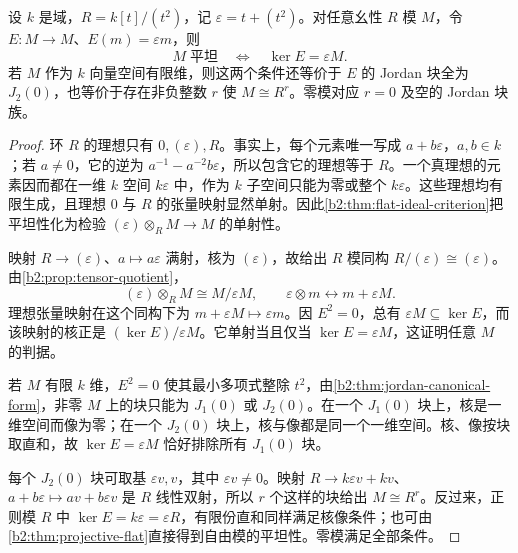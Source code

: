 \begin{proposition}\label{b2:prop:dual-number-flat}
	设 \(k\) 是域，\(R=k[t]/(t^2)\)，记 \(\varepsilon=t+(t^2)\)。对任意幺性 \(R\) 模 \(M\)，令 \(E:M\to M\)、\(E(m)=\varepsilon m\)，则
	\[
		M\;\text{平坦}\quad\Longleftrightarrow\quad\ker E=\varepsilon M.
	\]
	若 \(M\) 作为 \(k\) 向量空间有限维，则这两个条件还等价于 \(E\) 的 Jordan 块全为 \(J_2(0)\)，也等价于存在非负整数 \(r\) 使 \(M\cong R^r\)。零模对应 \(r=0\) 及空的 Jordan 块族。
\end{proposition}
\begin{proof}
	环 \(R\) 的理想只有 \(0,(\varepsilon),R\)。事实上，每个元素唯一写成 \(a+b\varepsilon\)，\(a,b\in k\)；若 \(a\ne0\)，它的逆为 \(a^{-1}-a^{-2}b\varepsilon\)，所以包含它的理想等于 \(R\)。一个真理想的元素因而都在一维 \(k\) 空间 \(k\varepsilon\) 中，作为 \(k\) 子空间只能为零或整个 \(k\varepsilon\)。这些理想均有限生成，且理想 \(0\) 与 \(R\) 的张量映射显然单射。因此\cref{b2:thm:flat-ideal-criterion}把平坦性化为检验 \((\varepsilon)\otimes_RM\to M\) 的单射性。

	映射 \(R\to(\varepsilon)\)、\(a\mapsto a\varepsilon\) 满射，核为 \((\varepsilon)\)，故给出 \(R\) 模同构 \(R/(\varepsilon)\cong(\varepsilon)\)。由\cref{b2:prop:tensor-quotient}，
	\[
		(\varepsilon)\otimes_RM\cong M/\varepsilon M, \qquad \varepsilon\otimes m\longleftrightarrow m+\varepsilon M.
	\]
	理想张量映射在这个同构下为 \(m+\varepsilon M\mapsto\varepsilon m\)。因 \(E^2=0\)，总有 \(\varepsilon M\subseteq\ker E\)，而该映射的核正是 \((\ker E)/\varepsilon M\)。它单射当且仅当 \(\ker E=\varepsilon M\)，这证明任意 \(M\) 的判据。

	若 \(M\) 有限 \(k\) 维，\(E^2=0\) 使其最小多项式整除 \(t^2\)，由\cref{b2:thm:jordan-canonical-form}，非零 \(M\) 上的块只能为 \(J_1(0)\) 或 \(J_2(0)\)。在一个 \(J_1(0)\) 块上，核是一维空间而像为零；在一个 \(J_2(0)\) 块上，核与像都是同一个一维空间。核、像按块取直和，故 \(\ker E=\varepsilon M\) 恰好排除所有 \(J_1(0)\) 块。

	每个 \(J_2(0)\) 块可取基 \(\varepsilon v,v\)，其中 \(\varepsilon v\ne0\)。映射 \(R\to k\varepsilon v+kv\)、\(a+b\varepsilon\mapsto av+b\varepsilon v\) 是 \(R\) 线性双射，所以 \(r\) 个这样的块给出 \(M\cong R^r\)。反过来，正则模 \(R\) 中 \(\ker E=k\varepsilon=\varepsilon R\)，有限份直和同样满足核像条件；也可由\cref{b2:thm:projective-flat}直接得到自由模的平坦性。零模满足全部条件。
\end{proof}

